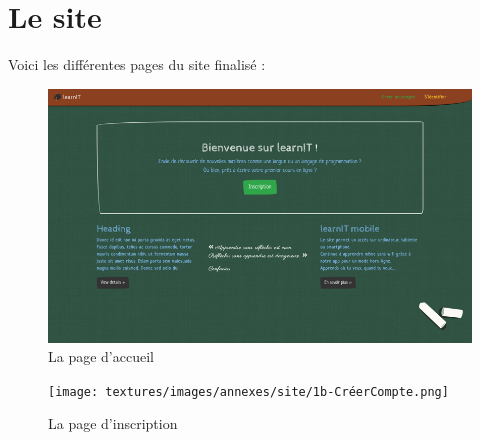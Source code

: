 \section*{Le site}
\label{sec:site}

Voici les différentes pages du site finalisé :

\begin{figure}[!h]
    \centering
    \includegraphics[scale=1]{textures/images/annexes/site/1a-Home.png}
    \caption{La page d'accueil}
\end{figure}
\begin{figure}[!h]
    \centering
    \texttt{[image: textures/images/annexes/site/1b-CréerCompte.png]}
    \caption{La page d'inscription}
\end{figure}

\newpage


